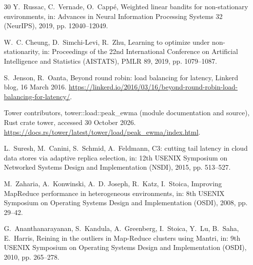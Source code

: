 \documentclass[final,5p,times,twocolumn]{elsarticle}
\begin{document}
\begin{thebibliography}{30}
 Y.~Russac, C.~Vernade, O.~Capp\'e, Weighted linear bandits for non-stationary environments, in: Advances in Neural Information Processing Systems 32 (NeurIPS), 2019, pp. 12040--12049.

 W.~C. Cheung, D.~Simchi-Levi, R.~Zhu, Learning to optimize under non-stationarity, in: Proceedings of the 22nd International Conference on Artificial Intelligence and Statistics (AISTATS), PMLR 89, 2019, pp. 1079--1087.

 S.~Jenson, R.~Oanta, Beyond round robin: load balancing for latency, Linkerd blog, 16 March 2016. \url{https://linkerd.io/2016/03/16/beyond-round-robin-load-balancing-for-latency/}.

 Tower contributors, tower::load::peak\_ewma (module documentation and source), Rust crate tower, accessed 30 October 2026. \url{https://docs.rs/tower/latest/tower/load/peak_ewma/index.html}.

 L.~Suresh, M.~Canini, S.~Schmid, A.~Feldmann, C3: cutting tail latency in cloud data stores via adaptive replica selection, in: 12th USENIX Symposium on Networked Systems Design and Implementation (NSDI), 2015, pp. 513--527.

 M.~Zaharia, A.~Konwinski, A.~D. Joseph, R.~Katz, I.~Stoica, Improving MapReduce performance in heterogeneous environments, in: 8th USENIX Symposium on Operating Systems Design and Implementation (OSDI), 2008, pp. 29--42.

 G.~Ananthanarayanan, S.~Kandula, A.~Greenberg, I.~Stoica, Y.~Lu, B.~Saha, E.~Harris, Reining in the outliers in Map-Reduce clusters using Mantri, in: 9th USENIX Symposium on Operating Systems Design and Implementation (OSDI), 2010, pp. 265--278.

\end{thebibliography}
\end{document}
